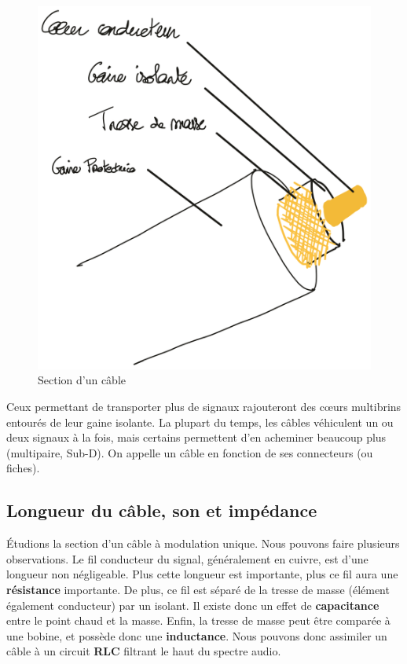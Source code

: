 \documentclass[
]{book}
\begin{document}
\begin{figure}

{\centering \includegraphics[width=0.6\linewidth]{_resources/drawings/cable} 

}

\caption{Section d'un câble}\label{fig:unnamed-chunk-29}
\end{figure}

Ceux permettant de transporter plus de signaux rajouteront des cœurs multibrins entourés de leur gaine isolante. La plupart du temps, les câbles véhiculent un ou deux signaux à la fois, mais certains permettent d'en acheminer beaucoup plus (multipaire, Sub-D). On appelle un câble en fonction de ses connecteurs (ou fiches).

\hypertarget{longueur-du-cuxe2ble-son-et-impuxe9dance}{%
\subsection{Longueur du câble, son et impédance}\label{longueur-du-cuxe2ble-son-et-impuxe9dance}}

Étudions la section d'un câble à modulation unique. Nous pouvons faire plusieurs observations. Le fil conducteur du signal, généralement en cuivre, est d'une longueur non négligeable. Plus cette longueur est importante, plus ce fil aura une \textbf{résistance} importante. De plus, ce fil est séparé de la tresse de masse (élément également conducteur) par un isolant. Il existe donc un effet de \textbf{capacitance} entre le point chaud et la masse. Enfin, la tresse de masse peut être comparée à une bobine, et possède donc une \textbf{inductance}. Nous pouvons donc assimiler un câble à un circuit \textbf{RLC} filtrant le haut du spectre audio.
\end{document}
